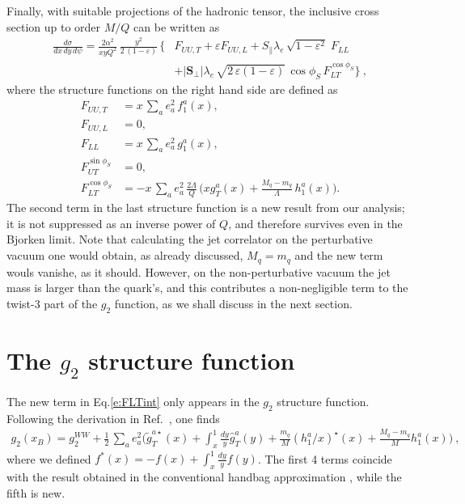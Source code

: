 \documentclass[preprintnumbers,floatfix,nofootinbib]{revtex4}
\newcommand{\xbj}{x}                   %
\newcommand{\mj}{M_q}
\begin{document}
Finally, with suitable projections of the hadronic tensor, the inclusive cross section up to order $M/Q$ can be written as
\begin{align}
\frac{d\sigma}{d\xbj \, dy\, d\psi}
=
\frac{2 \alpha^2}{\xbj y Q^2}\,
\frac{y^2}{2\,(1-\varepsilon)}\, 
\biggl\{
&F_{UU ,T} + \varepsilon F_{UU ,L}
+ S_\parallel \lambda_e\,
  \sqrt{1-\varepsilon^2}\; 
F_{LL}
\\  
&
+ |\bm{S}_\perp| \lambda_e\, \sqrt{2\,\varepsilon (1-\varepsilon)}\, 
  \cos\phi_S\, 
F_{LT}^{\cos \phi_S}
 \biggr\} \ ,
\label{e:crossdis}
\end{align}
where the structure functions on the right hand side are defined as
\begin{align}
F_{UU ,T} &= \xbj\,\sum_a e_a^2\,f_1^a(\xbj),
\\
F_{UU ,L} &= 0,
\\
F_{LL} &=\xbj\,\sum_a e_a^2\,g_1^a(\xbj),
\\
F_{UT}^{\sin \phi_S}&=0,
\label{e:FUTint}
\\
F_{LT}^{\cos \phi_S}&=-\xbj\,\sum_a e_a^2\, \frac{2\Lambda}{Q}\,
\biggl(\xbj  g_T^a(\xbj)
   + \frac{\mj -m_q}{\Lambda} \, h_{1}^a(\xbj) \biggr).
\label{e:FLTint}
\end{align}
The second term in the last structure function is a new result from our
analysis; it is not suppressed as an inverse power of $Q$, and therefore
survives even in the Bjorken limit. Note that calculating the jet correlator
on the perturbative vacuum one would obtain, as already discussed, $\mj=m_q$
and the new term wouls vanishe, as it should. However, on the non-perturbative
vacuum the jet mass is larger than the quark's, and this contributes a
non-negligible term to the twist-3 part of the $g_2$ function, as we shall
discuss in the next section.  

 

\section{The $g_2$ structure function}

The new term in Eq.\eqref{e:FLTint} only appears in the $g_2$ structure function. Following the derivation in Ref.~\cite{ABMS}, one finds
\begin{align}
\label{e:g2}
  g_2(x_B) = g_2^{WW} + \frac{1}{2}\,\sum_a e_a^2
\biggl(
    \widetilde g_T^{a \star}(x) 
    + \int_x^1\frac{dy}{y} \widehat{g}_T^a(y) 
    + \frac{m_q}{M} (h_1^a/x)^\star(x) 
    + \frac{\mj-m_q}{M} h_1^a(x) 
\Biggr) \ ,
\end{align}
where we defined $f^*(x) = -f(x) + \int_x^1\frac{dy}{y} f(y)$. The first 4
terms coincide with the result obtained in the conventional handbag
approximation \cite{ABMS}, while the fifth is new. 
\end{document}
